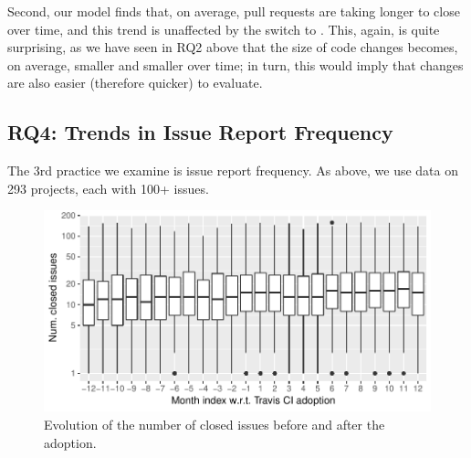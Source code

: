 Second, our model finds that, on average, pull requests are taking longer to close 
over time, and this trend is unaffected by the switch to \Tvis.
This, again, is quite surprising, as we have seen in RQ2 above that the size of 
code changes becomes, on average, smaller and smaller over time; in turn, this
would imply that changes are also easier (therefore quicker) to evaluate.



\subsection{RQ4: Trends in Issue Report Frequency}

The 3rd practice we examine is issue report frequency.
As above, we use data on 293 projects, each with 
100+ issues.

\begin{figure}[t]
\centering
\includegraphics[width=\columnwidth, clip=true, trim=0 0 0 0]{figures/issues.pdf}
\caption{Evolution of the number of closed issues before and after the \Tvis adoption.}
\label{fig:issues}
\end{figure}






%
%
%

